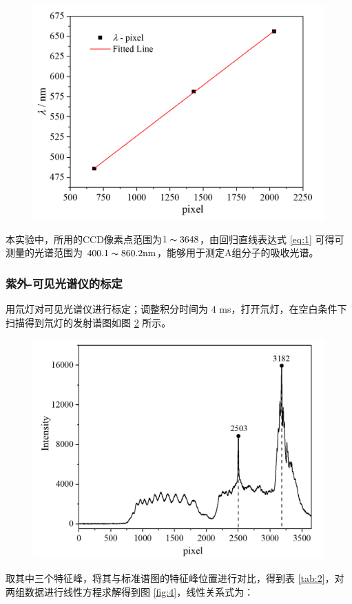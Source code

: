\begin{figure}[H]
    \centering
    \includegraphics[width=.6\textwidth]{figures2/1-2.png}
    \label{fig:2}
\end{figure}

本实验中，所用的CCD像素点范围为$1\thicksim 3648$，由回归直线表达式 \eqref{eq:1} 可得可测量的光谱范围为 $400.1\thicksim 860.2 \si{nm}$，能够用于测定A组分子的吸收光谱。

\subsubsection{紫外-可见光谱仪的标定}

用氘灯对可见光谱仪进行标定；调整积分时间为 4 \si{ms}，打开氘灯，在空白条件下扫描得到氘灯的发射谱图如图 \ref{fig:3} 所示。

\begin{figure}[H]
    \centering
    \includegraphics[width=.6\textwidth]{figures2/1-3.png}
    \label{fig:3}
\end{figure}

取其中三个特征峰，将其与标准谱图的特征峰位置进行对比，得到表 \ref{tab:2}，对两组数据进行线性方程求解得到图 \ref{fig:4}，线性关系式为：

